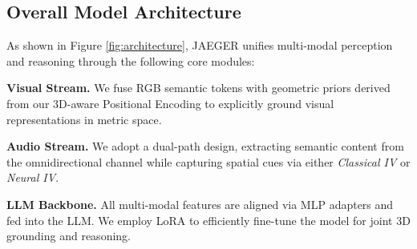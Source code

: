\subsection{Overall Model Architecture}

As shown in Figure \ref{fig:architecture}, JAEGER unifies multi-modal perception and reasoning through the following core modules:

\textbf{Visual Stream.} We fuse RGB semantic tokens with geometric priors derived from our 3D-aware Positional Encoding to explicitly ground visual representations in metric space.

\textbf{Audio Stream.} We adopt a dual-path design, extracting semantic content from the omnidirectional channel while capturing spatial cues via either \textit{Classical IV} or \textit{Neural IV}.

\textbf{LLM Backbone.} All multi-modal features are aligned via MLP adapters and fed into the LLM. We employ LoRA \cite{hu2022lora} to efficiently fine-tune the model for joint 3D grounding and reasoning.


